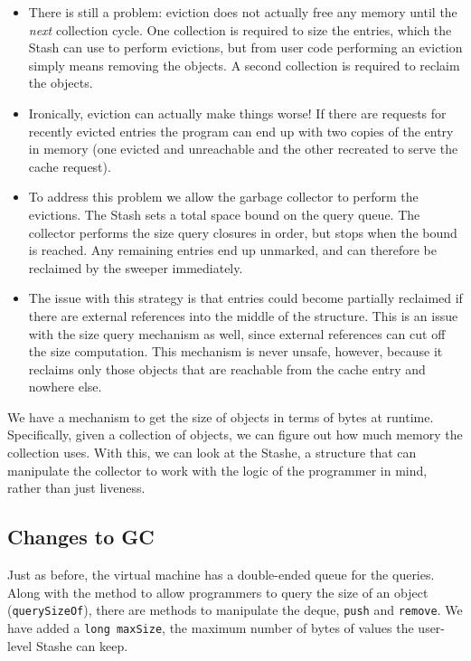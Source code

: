 \begin{itemize}
\item There is still a problem: eviction does not actually free any memory until
  the \emph{next} collection cycle. One collection is required to size the
  entries, which the Stash can use to perform evictions, but from user code
  performing an eviction simply means removing the objects. A second collection
  is required to reclaim the objects.

\item Ironically, eviction can actually make things worse! If there are requests
  for recently evicted entries the program can end up with two copies of the
  entry in memory (one evicted and unreachable and the other recreated to serve
  the cache request).

\item To address this problem we allow the garbage collector to perform the
  evictions. The Stash sets a total space bound on the query queue. The
  collector performs the size query closures in order, but stops when the bound
  is reached. Any remaining entries end up unmarked, and can therefore be
  reclaimed by the sweeper immediately.

\item The issue with this strategy is that entries could become partially
  reclaimed if there are external references into the middle of the
  structure. This is an issue with the size query mechanism as well, since
  external references can cut off the size computation. This mechanism is never
  unsafe, however, because it reclaims only those objects that are reachable
  from the cache entry and nowhere else.

\end{itemize}


We have a mechanism to get the size of objects in terms of bytes at
runtime. Specifically, given a collection of objects, we can figure out how much
memory the collection uses. With this, we can look at the Stashe, a structure
that can manipulate the collector to work with the logic of the programmer in
mind, rather than just liveness.

\subsection{Changes to GC}

Just as before, the virtual machine has a double-ended queue for the
queries. Along with the method to allow programmers to query the size of an
object (\lstinline{querySizeOf}), there are methods to manipulate the deque,
\lstinline{push} and \lstinline{remove}. We have added a \lstinline{long maxSize}, 
the maximum number of bytes of values the user-level Stashe can
keep.

